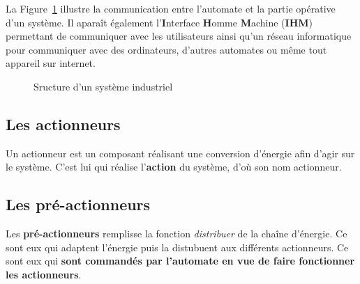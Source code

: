 \documentclass[11pt]{article}
\begin{document}
La Figure~\ref{fig:structureAPI} illustre la communication entre l'automate et la partie opérative d'un système. Il aparaît également l'\textbf{I}nterface \textbf{H}omme \textbf{M}achine (\textbf{IHM}) permettant de communiquer avec les utilisateurs ainsi qu'un réseau informatique pour communiquer avec des ordinateurs, d'autres automates ou même tout appareil sur internet.

\begin{figure}[ht]
	\centering
	
	\caption{Sructure d'un système industriel}
	\label{fig:structureAPI}
\end{figure}

\subsection{Les actionneurs}
Un actionneur est un composant réalisant une conversion d'énergie afin d'agir sur le système. C'est lui qui réalise l'\textbf{action} du système, d'où son nom actionneur.


\subsection{Les pré-actionneurs}
Les \textbf{pré-actionneurs} remplisse la fonction \textit{distribuer} de la chaîne d'énergie. Ce sont eux qui  adaptent l'énergie puis la distubuent aux différents actionneurs. Ce sont eux qui \textbf{sont commandés par l'automate en vue de faire fonctionner les actionneurs}.
\end{document}
